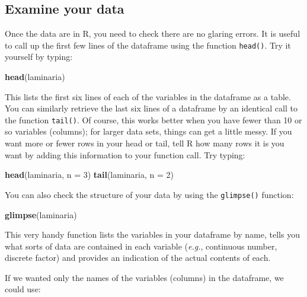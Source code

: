 \documentclass[]{book}
\newenvironment{Shaded}{\begin{snugshade}}{\end{snugshade}}
\newcommand{\KeywordTok}[1]{\textcolor[rgb]{0.13,0.29,0.53}{\textbf{#1}}}
\newcommand{\DataTypeTok}[1]{\textcolor[rgb]{0.13,0.29,0.53}{#1}}
\newcommand{\DecValTok}[1]{\textcolor[rgb]{0.00,0.00,0.81}{#1}}
\newcommand{\NormalTok}[1]{#1}
\theoremstyle{definition}
\theoremstyle{definition}
\theoremstyle{definition}
\theoremstyle{remark}
\begin{document}
\subsection{Examine your data}\label{examine-your-data}

Once the data are in R, you need to check there are no glaring errors.
It is useful to call up the first few lines of the dataframe using the
function \texttt{head()}. Try it yourself by typing:

\begin{Shaded}
\begin{Highlighting}[]
\KeywordTok{head}\NormalTok{(laminaria)}
\end{Highlighting}
\end{Shaded}

This lists the first six lines of each of the variables in the dataframe
as a table. You can similarly retrieve the last six lines of a dataframe
by an identical call to the function \texttt{tail()}. Of course, this
works better when you have fewer than 10 or so variables (columns); for
larger data sets, things can get a little messy. If you want more or
fewer rows in your head or tail, tell R how many rows it is you want by
adding this information to your function call. Try typing:

\begin{Shaded}
\begin{Highlighting}[]
\KeywordTok{head}\NormalTok{(laminaria, }\DataTypeTok{n =} \DecValTok{3}\NormalTok{)}
\KeywordTok{tail}\NormalTok{(laminaria, }\DataTypeTok{n =} \DecValTok{2}\NormalTok{)}
\end{Highlighting}
\end{Shaded}

You can also check the structure of your data by using the
\texttt{glimpse()} function:

\begin{Shaded}
\begin{Highlighting}[]
\KeywordTok{glimpse}\NormalTok{(laminaria)}
\end{Highlighting}
\end{Shaded}

This very handy function lists the variables in your dataframe by name,
tells you what sorts of data are contained in each variable
(\emph{e.g.}, continuous number, discrete factor) and provides an
indication of the actual contents of each.

If we wanted only the names of the variables (columns) in the dataframe,
we could use:
\end{document}
